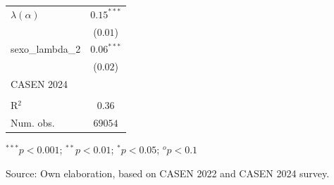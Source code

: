\begin{table}[H]
\begin{center}
\begin{threeparttable}
\begin{tabular}{lc}
$\lambda(\alpha)$ & $0.15^{***}$ \\ 
 & ($0.01$) \\ 
sexo_lambda_2 & $0.06^{***}$ \\ 
 & ($0.02$) \\ 
CASEN 2024 &  \\ 
 &  \\ 
R$^2$ & $0.36$ \\ 
Num. obs. & $69054$ \\ \bottomrule
\end{tabular}
\begin{tablenotes}
\item ${}^{***}p<0.001$; ${}^{**}p<0.01$; ${}^{*}p<0.05$; ${}^{o}p<0.1$
\item Source: Own elaboration, based on CASEN 2022 and CASEN 2024 survey.
\end{tablenotes}
\end{threeparttable}
\end{center}
\end{table}